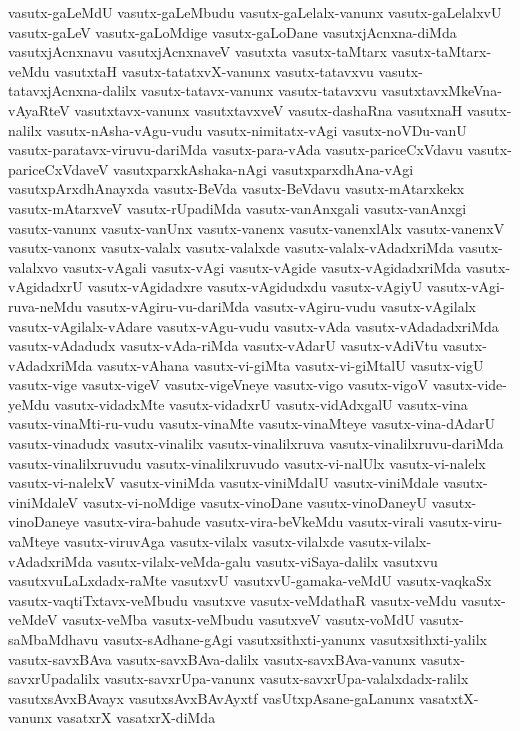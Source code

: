 {vasutx-gaLeMdU
vasutx-gaLeMbudu
vasutx-gaLelalx-vanunx
vasutx-gaLelalxvU
vasutx-gaLeV
vasutx-gaLoMdige
vasutx-gaLoDane
vasutxjAcnxna-diMda
vasutxjAcnxnavu
vasutxjAcnxnaveV
vasutxta
vasutx-taMtarx
vasutx-taMtarx-veMdu
vasutxtaH
vasutx-tatatxvX-vanunx
vasutx-tatavxvu
vasutx-tatavxjAcnxna-dalilx
vasutx-tatavx-vanunx
vasutx-tatavxvu
vasutxtavxMkeVna-vAyaRteV
vasutxtavx-vanunx
vasutxtavxveV
vasutx-dashaRna
vasutxnaH
vasutx-nalilx
vasutx-nAsha-vAgu-vudu
vasutx-nimitatx-vAgi
vasutx-noVDu-vanU
vasutx-paratavx-viruvu-dariMda
vasutx-para-vAda
vasutx-pariceCxVdavu
vasutx-pariceCxVdaveV
vasutxparxkAshaka-nAgi
vasutxparxdhAna-vAgi
vasutxpArxdhAnayxda
vasutx-BeVda
vasutx-BeVdavu
vasutx-mAtarxkekx
vasutx-mAtarxveV
vasutx-rUpadiMda
vasutx-vanAnxgali
vasutx-vanAnxgi
vasutx-vanunx
vasutx-vanUnx
vasutx-vanenx
vasutx-vanenxlAlx
vasutx-vanenxV
vasutx-vanonx
vasutx-valalx
vasutx-valalxde
vasutx-valalx-vAdadxriMda
vasutx-valalxvo
vasutx-vAgali
vasutx-vAgi
vasutx-vAgide
vasutx-vAgidadxriMda
vasutx-vAgidadxrU
vasutx-vAgidadxre
vasutx-vAgidudxdu
vasutx-vAgiyU
vasutx-vAgi-ruva-neMdu
vasutx-vAgiru-vu-dariMda
vasutx-vAgiru-vudu
vasutx-vAgilalx
vasutx-vAgilalx-vAdare
vasutx-vAgu-vudu
vasutx-vAda
vasutx-vAdadadxriMda
vasutx-vAdadudx
vasutx-vAda-riMda
vasutx-vAdarU
vasutx-vAdiVtu
vasutx-vAdadxriMda
vasutx-vAhana
vasutx-vi-giMta
vasutx-vi-giMtalU
vasutx-vigU
vasutx-vige
vasutx-vigeV
vasutx-vigeVneye
vasutx-vigo
vasutx-vigoV
vasutx-vide-yeMdu
vasutx-vidadxMte
vasutx-vidadxrU
vasutx-vidAdxgalU
vasutx-vina
vasutx-vinaMti-ru-vudu
vasutx-vinaMte
vasutx-vinaMteye
vasutx-vina-dAdarU
vasutx-vinadudx
vasutx-vinalilx
vasutx-vinalilxruva
vasutx-vinalilxruvu-dariMda
vasutx-vinalilxruvudu
vasutx-vinalilxruvudo
vasutx-vi-nalUlx
vasutx-vi-nalelx
vasutx-vi-nalelxV
vasutx-viniMda
vasutx-viniMdalU
vasutx-viniMdale
vasutx-viniMdaleV
vasutx-vi-noMdige
vasutx-vinoDane
vasutx-vinoDaneyU
vasutx-vinoDaneye
vasutx-vira-bahude
vasutx-vira-beVkeMdu
vasutx-virali
vasutx-viru-vaMteye
vasutx-viruvAga
vasutx-vilalx
vasutx-vilalxde
vasutx-vilalx-vAdadxriMda
vasutx-vilalx-veMda-galu
vasutx-viSaya-dalilx
vasutxvu
vasutxvuLaLxdadx-raMte
vasutxvU
vasutxvU-gamaka-veMdU
vasutx-vaqkaSx
vasutx-vaqtiTxtavx-veMbudu
vasutxve
vasutx-veMdathaR
vasutx-veMdu
vasutx-veMdeV
vasutx-veMba
vasutx-veMbudu
vasutxveV
vasutx-voMdU
vasutx-saMbaMdhavu
vasutx-sAdhane-gAgi
vasutxsithxti-yanunx
vasutxsithxti-yalilx
vasutx-savxBAva
vasutx-savxBAva-dalilx
vasutx-savxBAva-vanunx
vasutx-savxrUpadalilx
vasutx-savxrUpa-vanunx
vasutx-savxrUpa-valalxdadx-ralilx
vasutxsAvxBAvayx
vasutxsAvxBAvAyxtf
vasUtxpAsane-gaLanunx
vasatxtX-vanunx
vasatxrX
vasatxrX-diMda
}
